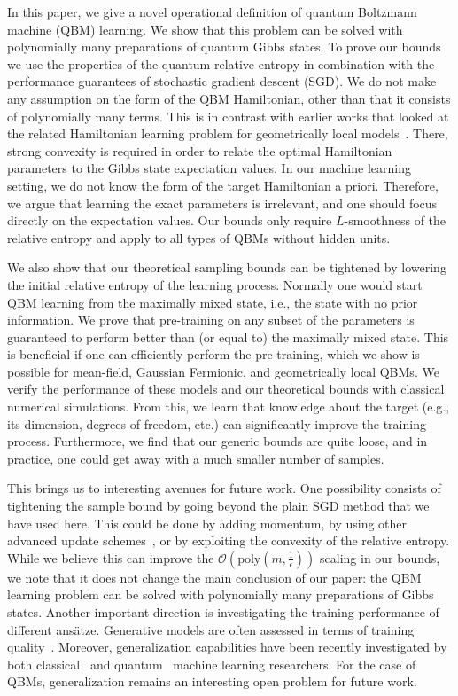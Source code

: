 \documentclass[
    aps,
    prx,
    floatfix,
    nofootinbib,
    onecolumn
]{revtex4-2}
\begin{document}
In this paper, we give a novel operational definition of quantum Boltzmann machine (QBM) learning. We show that this problem can be solved with polynomially many preparations of quantum Gibbs states. To prove our bounds we use the properties of the quantum relative entropy in combination with the performance guarantees of stochastic gradient descent (SGD). We do not make any assumption on the form of the QBM Hamiltonian, other than that it consists of polynomially many terms. This is in contrast with earlier works that looked at the related Hamiltonian learning problem for geometrically local models~\cite{Anshu_2021, Haah_2022}. There, strong convexity is required in order to relate the optimal Hamiltonian parameters to the Gibbs state expectation values. In our machine learning setting, we do not know the form of the target Hamiltonian a priori. Therefore, we argue that learning the exact parameters is irrelevant, and one should focus directly on the expectation values. Our bounds only require $L$-smoothness of the relative entropy and apply to all types of QBMs without hidden units.

We also show that our theoretical sampling bounds can be tightened by lowering the initial relative entropy of the learning process. Normally one would start QBM learning from the maximally mixed state, i.e., the state with no prior information. We prove that pre-training on any subset of the parameters is guaranteed to perform better than (or equal to) the maximally mixed state. This is beneficial if one can efficiently perform the pre-training, which we show is possible for mean-field, Gaussian Fermionic, and geometrically local QBMs. We verify the performance of these models and our theoretical bounds with classical numerical simulations. From this, we learn that knowledge about the target (e.g., its dimension, degrees of freedom, etc.) can significantly improve the training process. Furthermore, we find that our generic bounds are quite loose, and in practice, one could get away with a much smaller number of samples.  

This brings us to interesting avenues for future work. One possibility consists of tightening the sample bound by going beyond the plain SGD method that we have used here. This could be done by adding momentum, by using other advanced update schemes~\cite{foster2019complexity, Garrigos2023}, or by exploiting the convexity of the relative entropy. While we believe this can improve the $\mathcal{O}(\mathrm{poly}(m, \frac{1}{\epsilon}))$ scaling in our bounds, we note that it does not change the main conclusion of our paper: the QBM learning problem can be solved with polynomially many preparations of Gibbs states.
Another important direction is investigating the training performance of different ans\"{a}tze. Generative models are often assessed in terms of training quality~\cite{riofrio2023performance}. Moreover, generalization capabilities have been recently investigated by both classical~\cite{zhao2018bias,thanhtung2021generalization} and quantum~\cite{du2022power,gili2023generalization} machine learning researchers. For the case of QBMs, generalization remains an interesting open problem for future work.
\end{document}

